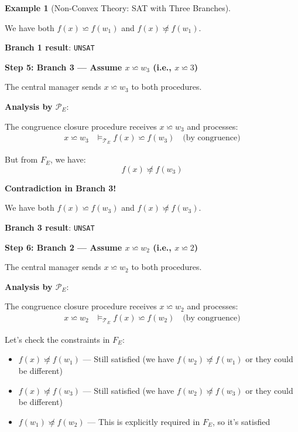 \documentclass[11pt,a4paper]{article}
\theoremstyle{definition}
\newtheorem{example}{Example}[section]
\theoremstyle{plain}
\theoremstyle{remark}
\begin{document}
\begin{example}[Non-Convex Theory: SAT with Three Branches]
\begin{tcolorbox}[colback=green!5!white,colframe=green!75!black,title=\textbf{Example 4: Non-Convex $\mathcal{T}_{\text{LIA}}$ — One SAT Branch Suffices},breakable]
We have both $f(x) \backsimeq f(w_1)$ and $f(x) \not\backsimeq f(w_1)$.

\textbf{Branch 1 result}: \texttt{UNSAT}

\vspace{0.5em}

\textbf{Step 5: Branch 3 — Assume $x \backsimeq w_3$ (i.e., $x \backsimeq 3$)}

The central manager sends $x \backsimeq w_3$ to both procedures.

\textbf{Analysis by $\mathcal{P}_E$}:

The congruence closure procedure receives $x \backsimeq w_3$ and processes:
\begin{align*}
x \backsimeq w_3 &\models_{\mathcal{T}_E} f(x) \backsimeq f(w_3) \quad \text{(by congruence)}
\end{align*}

But from $F_E$, we have:
\[
f(x) \not\backsimeq f(w_3)
\]

\textbf{Contradiction in Branch 3!}

We have both $f(x) \backsimeq f(w_3)$ and $f(x) \not\backsimeq f(w_3)$.

\textbf{Branch 3 result}: \texttt{UNSAT}

\vspace{0.5em}

\textbf{Step 6: Branch 2 — Assume $x \backsimeq w_2$ (i.e., $x \backsimeq 2$)}

The central manager sends $x \backsimeq w_2$ to both procedures.

\textbf{Analysis by $\mathcal{P}_E$}:

The congruence closure procedure receives $x \backsimeq w_2$ and processes:
\begin{align*}
x \backsimeq w_2 &\models_{\mathcal{T}_E} f(x) \backsimeq f(w_2) \quad \text{(by congruence)}
\end{align*}

Let's check the constraints in $F_E$:
\begin{itemize}
    \item $f(x) \not\backsimeq f(w_1)$ — Still satisfied (we have $f(w_2) \not\backsimeq f(w_1)$ or they could be different)
    \item $f(x) \not\backsimeq f(w_3)$ — Still satisfied (we have $f(w_2) \not\backsimeq f(w_3)$ or they could be different)
    \item $f(w_1) \not\backsimeq f(w_2)$ — This is explicitly required in $F_E$, so it's satisfied
\end{itemize}


\end{tcolorbox}
\end{example}
\end{document}
